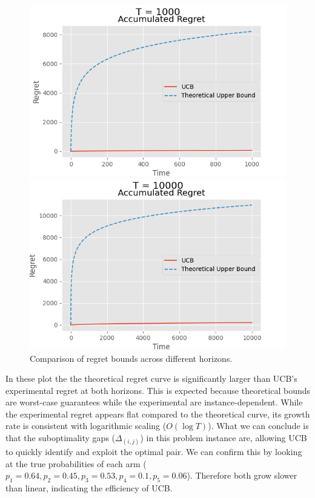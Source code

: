 \documentclass{article}
\begin{document}
\begin{figure}[h!]
    \centering
    \begin{minipage}{0.45\textwidth}
        \centering
        \includegraphics[width=\textwidth]{./Images/plot1.png}
    \end{minipage}\hfill
    \begin{minipage}{0.45\textwidth}
        \centering
        \includegraphics[width=\textwidth]{./Images/plot4.png}
    \end{minipage}
    \caption{Comparison of regret bounds across different horizons.}
    \label{fig:algorithms_comparison}
\end{figure}

\newpage

\noindent In these plot the the theoretical regret curve is significantly 
larger than UCB’s experimental regret at both horizons.
This is expected because theoretical bounds are worst-case guarantees while 
the experimental are instance-dependent.
While the experimental regret appears flat compared to 
the theoretical curve, its growth rate is consistent with logarithmic scaling ($O(\log T)$).
What we can conclude is that the suboptimality gaps ($\Delta_{(i,j)}$)
in this problem instance are, allowing UCB to quickly 
identify and exploit the optimal pair. We can confirm this
by looking at the true probabilities of each arm ($p_1=0.64, p_2=0.45, p_3=
0.53, p_4=0.1, p_5=0.06$). Therefore both grow slower than linear,
indicating the efficiency of UCB. 
\end{document}
